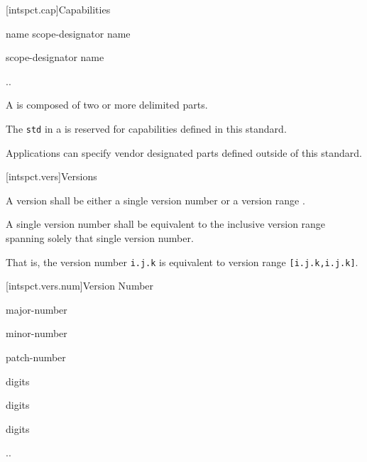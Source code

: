 [intspct.cap]{Capabilities}

\pnum
\begin{ncbnf}

\br
	name scope-designator name 

\br
	scope-designator name 

\br
	\br
	 ..  \br
	 

\br
	 

\end{ncbnf}

\pnum
A  is composed of two or more
 delimited  parts.

\pnum
The  \verb|std| in a  is
reserved for capabilities defined in this standard.

\pnum
Applications can specify vendor designated  parts defined
outside of this standard.

[intspct.vers]{Versions}

\pnum
A version shall be either a single version number  or a
version range .

\pnum
A single version number shall be equivalent to the inclusive version range
spanning solely that single version number.

\begin{note}
That is, the version number \verb|i.j.k| is equivalent to version range
\verb|[i.j.k,i.j.k]|.
\end{note}

[intspct.vers.num]{Version Number}

\pnum
\begin{ncbnf}

\br
	major-number 

\br
	  minor-number 

\br
	  patch-number

\br
	digits

\br
	digits

\br
	digits

\br
	\br
	 ..  

\end{ncbnf}

